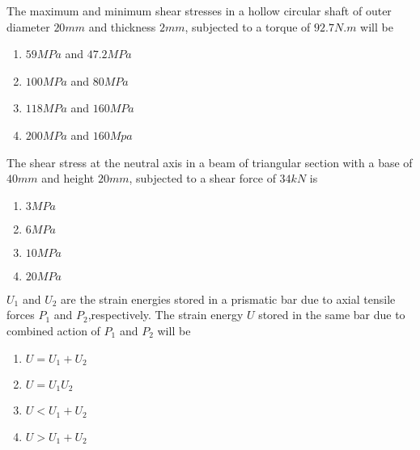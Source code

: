 \item The maximum and minimum shear stresses in a hollow circular shaft of outer diameter $20 mm$ and thickness $2 mm$, subjected to a torque of $92.7 N.m$ will be
	\begin{enumerate}
                \item $59 MPa$ and $47.2MPa$
                \item $100 MPa$ and $80 MPa$
                \item $118 MPa$ and $160 MPa$
                \item $200 MPa$ and $160 Mpa$
        \end{enumerate}
\item The shear stress at the neutral axis in a beam of triangular section with a base of $40 mm$ and height $20 mm$, subjected to a shear force of $34 kN$ is
	\begin{enumerate}
                \item $3 MPa$
                \item $6 MPa$
                \item $10 MPa$
                \item $20 MPa$
        \end{enumerate}
\item $U_1$ and $U_2$ are the strain energies stored in a prismatic bar due to axial tensile forces $P_1$ and $P_2$,respectively. The strain energy $U$ stored in the same bar due to combined action of $P_1$ and $P_2$ will be 
\begin{enumerate}
                \item $U=U_1+U_2$
                \item $U=U_1U_2$ 
                \item $U<U_1+U_2$ 
                \item $U>U_1+U_2$ 
        \end{enumerate}     

 

